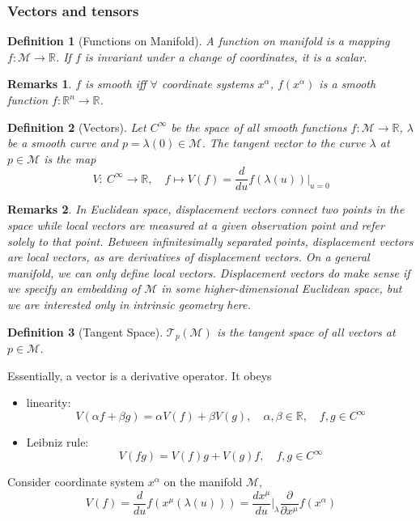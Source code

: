\documentclass[a4paper]{article}
\newtheorem{remarks}{Remarks}[section]
\theoremstyle{new}
\newtheorem{defi}{Definition}[section]
\begin{document}
\subsubsection{Vectors and tensors}
\begin{defi}[Functions on Manifold]
A function on manifold is a mapping $f:\mathcal{M}\rightarrow\mathbb{R}$. If $f$ is invariant under a change of coordinates, it is a scalar.
\end{defi}
\begin{remarks}
$f$ is smooth iff $\forall $ coordinate systems $x^\alpha$, $f(x^\alpha)$ is a smooth function $f:\mathbb{R}^n\rightarrow\mathbb{R}$. 
\end{remarks}
\begin{defi}[Vectors]
Let $C^\infty$ be the space of all smooth functions $f:\mathcal{M}\rightarrow\mathbb{R}$, $\lambda$ be a smooth curve and $p=\lambda(0)\in\mathcal{M}$. The tangent vector to the curve $\lambda$ at $p\in\mathcal{M}$ is the map
$$V:~C^\infty\rightarrow\mathbb{R},\quad f\mapsto V(f)=\frac{d}{du}f(\lambda(u))\bigg|_{u=0}$$
\end{defi}
\begin{remarks}
In Euclidean space, displacement vectors connect two points in the space while local vectors are measured at a given observation point and refer solely to that point. Between infinitesimally separated points, displacement vectors are local vectors, as are derivatives of displacement vectors. On a general manifold, we can only define local vectors. Displacement vectors do make sense if we specify an embedding of $\mathcal{M}$ in some higher-dimensional Euclidean space, but we are interested only in intrinsic geometry here.
\end{remarks}
\begin{defi}[Tangent Space]
$\mathcal{T}_p(\mathcal{M})$ is the tangent space of all vectors at $p\in\mathcal{M}$.
\end{defi}
Essentially, a vector is a derivative operator. It obeys
\begin{itemize}
    \item linearity: 
    $$V(\alpha f+\beta g)=\alpha V(f)+\beta V(g),\quad\alpha,\beta\in\mathbb{R},\quad f,g\in C^\infty$$
    \item Leibniz rule:
    $$V(fg)=V(f)g+V(g)f,\quad f,g\in C^\infty$$
\end{itemize}
Consider coordinate system $x^\alpha$ on the manifold $\mathcal{M}$, 
\begin{equation}
V(f)=\frac{d}{du}f(x^\mu(\lambda(u)))=\frac{dx^\mu}{du}\bigg|_\lambda\frac{\partial}{\partial x^\mu}f(x^\alpha)\label{vector}
\end{equation}
\end{document}
